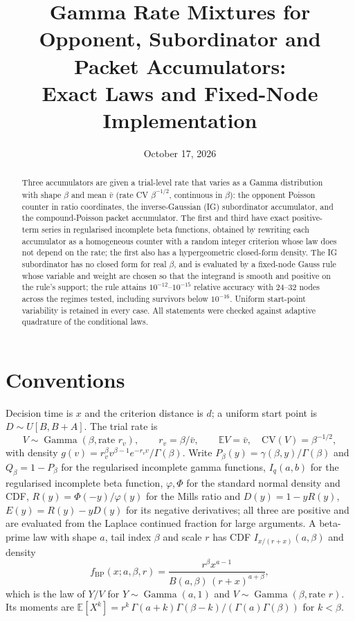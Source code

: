 \documentclass[11pt]{article}
\title{Gamma Rate Mixtures for Opponent, Subordinator and Packet Accumulators:\\ Exact Laws and Fixed-Node Implementation}
\date{October 17, 2026}
\newcommand{\Gam}{\operatorname{Gamma}}
\newcommand{\E}{\mathbb{E}}
\newcommand{\Ireg}{I}
\begin{document}
\maketitle

\begin{abstract}
Three accumulators are given a trial-level rate that varies as a Gamma distribution with shape $\beta$ and mean $\bar v$ (rate CV $\beta^{-1/2}$, continuous in $\beta$): the opponent Poisson counter in ratio coordinates, the inverse-Gaussian (IG) subordinator accumulator, and the compound-Poisson packet accumulator. The first and third have exact positive-term series in regularised incomplete beta functions, obtained by rewriting each accumulator as a homogeneous counter with a random integer criterion whose law does not depend on the rate; the first also has a hypergeometric closed-form density. The IG subordinator has no closed form for real $\beta$, and is evaluated by a fixed-node Gauss rule whose variable and weight are chosen so that the integrand is smooth and positive on the rule's support; the rule attains $10^{-12}$--$10^{-15}$ relative accuracy with 24--32 nodes across the regimes tested, including survivors below $10^{-16}$. Uniform start-point variability is retained in every case. All statements were checked against adaptive quadrature of the conditional laws.
\end{abstract}

\section{Conventions}
Decision time is $x$ and the criterion distance is $d$; a uniform start point is $D\sim U[B,B+A]$. The trial rate is
\[
V\sim\Gam(\beta,\text{rate } r_v),\qquad r_v=\beta/\bar v,\qquad \E V=\bar v,\quad \mathrm{CV}(V)=\beta^{-1/2},
\]
with density $g(v)=r_v^{\beta}v^{\beta-1}e^{-r_v v}/\Gamma(\beta)$. Write $P_\beta(y)=\gamma(\beta,y)/\Gamma(\beta)$ and $Q_\beta=1-P_\beta$ for the regularised incomplete gamma functions, $\Ireg_q(a,b)$ for the regularised incomplete beta function, $\varphi,\Phi$ for the standard normal density and CDF, $R(y)=\Phi(-y)/\varphi(y)$ for the Mills ratio and $D(y)=1-yR(y)$, $E(y)=R(y)-yD(y)$ for its negative derivatives; all three are positive and are evaluated from the Laplace continued fraction for large arguments. A beta-prime law with shape $a$, tail index $\beta$ and scale $r$ has CDF $\Ireg_{x/(r+x)}(a,\beta)$ and density
\begin{equation}
f_{\mathrm{BP}}(x;a,\beta,r)=\frac{r^{\beta}x^{a-1}}{B(a,\beta)\,(r+x)^{a+\beta}},
\label{eq:bp}
\end{equation}
which is the law of $Y/V$ for $Y\sim\Gam(a,1)$ and $V\sim\Gam(\beta,\text{rate } r)$. Its moments are $\E[X^k]=r^k\,\Gamma(a+k)\Gamma(\beta-k)/(\Gamma(a)\Gamma(\beta))$ for $k<\beta$.
\end{document}
